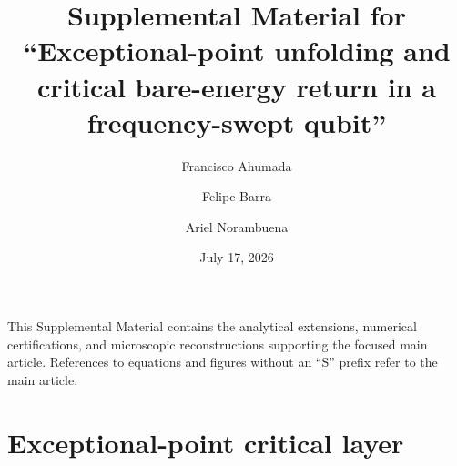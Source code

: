 \documentclass[reprint,superscriptaddress,floatfix,amsmath,amssymb,prresearch,aps]{revtex4-2}
\begin{document}
\title{Supplemental Material for ``Exceptional-point unfolding and critical
bare-energy return in a frequency-swept qubit''}

\author{Francisco Ahumada}
\author{Felipe Barra}
\author{Ariel Norambuena}

\date{July 17, 2026}
\maketitle

\setcounter{equation}{0}
\renewcommand{\theequation}{S\arabic{equation}}
\setcounter{figure}{0}
\renewcommand{\thefigure}{S\arabic{figure}}
\setcounter{table}{0}
\renewcommand{\thetable}{S\Roman{table}}

This Supplemental Material contains the analytical extensions, numerical
certifications, and microscopic reconstructions supporting the focused main
article. References to equations and figures without an ``S'' prefix refer
to the main article.



\section{Exceptional-point critical layer}
\label{sec:s_critical_layer}
\end{document}
